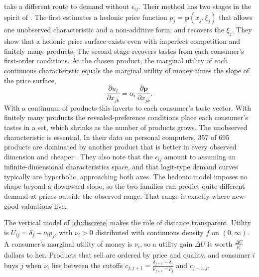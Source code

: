   take a different route to demand without
$\epsilon_{ij}$. Their method has two stages in the spirit of \citet{Rosen1974}. The first estimates a hedonic
price function $p_j = \mathbf{p}(x_j,\xi_j)$ that allows one unobserved characteristic and a non-additive form, and
recovers the $\xi_j$. They show that a hedonic price surface exists even with imperfect competition and finitely
many products. The second stage recovers tastes from each consumer's first-order conditions. At the chosen
product, the marginal utility of each continuous characteristic equals the marginal utility of money times the
slope of the price surface,
\begin{equation}\label{eq:10-bb-foc}
\frac{\partial u_i}{\partial x_{jk}} = \alpha_i\,\frac{\partial\mathbf{p}}{\partial x_{jk}} .
\end{equation}
With a continuum of products this inverts to each consumer's taste vector. With finitely many products the
revealed-preference conditions place each consumer's tastes in a set, which shrinks as the number of products
grows. The unobserved characteristic is essential. In their data on personal computers, 357 of 695 products are
dominated by another product that is better in every observed dimension and cheaper
\citep[p.~2]{BenkardBajari2004}.
They also note that the $\epsilon_{ij}$ amount to assuming an infinite-dimensional characteristics space, and that
logit-type demand curves typically are hyperbolic, approaching both axes. The hedonic model imposes no shape
beyond a downward slope, so the two families can predict quite different demand at prices outside the observed
range. That range is exactly where new-good valuations live.

 The vertical model of \cref{ch:discrete} makes the role of distance transparent.
Utility is $U_{ij} = \delta_j - \nu_ip_j$, with $\nu_i > 0$ distributed with continuous density $f$ on
$(0,\infty)$. A consumer's marginal utility of money is $\nu_i$, so a utility gain $\Delta U$ is worth
$\frac{\Delta U}{\nu_i}$ dollars to her. Products that sell are ordered by price and quality, and consumer $i$ buys
$j$ when $\nu_i$ lies between the cutoffs $c_{j,j+1} = \frac{\delta_{j+1}-\delta_j}{p_{j+1}-p_j}$ and $c_{j-1,j}$.


